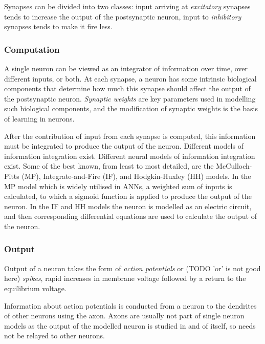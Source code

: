 \documentclass[a4paper,12pt]{report}
\theoremstyle{definition}
\begin{document}
Synapses can be divided into two classes: input arriving at \emph{excitatory} synapses tends to increase the output of the postsynaptic neuron, input to \emph{inhibitory} synapses tends to make it fire less.


\subsubsection{Computation}
A single neuron can be viewed as an integrator of information over time, over different inputs, or both. At each synapse, a neuron has some intrinsic biological components that determine how much this synapse should affect the output of the postsynaptic neuron. \emph{Synaptic weights} are key parameters used in modelling such biological components, and the modification of synaptic weights is the basis of learning in neurons.

After the contribution of input from each synapse is computed, this information must be integrated to produce the output of the neuron. Different models of information integration exist. Different neural models of information integration exist. Some of the best known, from least to most detailed, are the McCulloch-Pitts (MP), Integrate-and-Fire (IF), and Hodgkin-Huxley (HH) models. In the MP model which is widely utilised in ANNs, a weighted sum of inputs is calculated, to which a sigmoid function is applied to produce the output of the neuron. In the IF and HH models the neuron is modelled as an electric circuit, and then corresponding differential equations are used to calculate the output of the neuron.

\subsubsection{Output}

Output of a neuron takes the form of \emph{action potentials} or (TODO 'or' is not good here) \emph{spikes}, rapid increases in membrane voltage followed by a return to the equilibrium voltage.

Information about action potentials is conducted from a neuron to the dendrites of other neurons using the axon. Axons are usually not part of single neuron models as the output of the modelled neuron is studied in and of itself, so needs not be relayed to other neurons.
\end{document}
